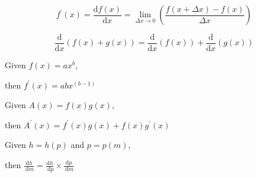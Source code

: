 \documentclass[10pt,a4paper]{Template}
\begin{document}
\thispagestyle{empty}


\begin{minipage}{0.48\textwidth}


\[ f^{\prime}(x)=\frac{\mathrm{d} f(x)}{\mathrm{d} x}=\lim _{\Delta x \rightarrow 0}\left(\frac{f(x+\Delta x)-f(x)}{\Delta x}\right)\]

\divider


\[
\frac{\mathrm{d}}{\mathrm{d} x}(f(x)+g(x))=\frac{\mathrm{d}}{\mathrm{d} x}(f(x))+\frac{\mathrm{d}}{\mathrm{d} x}(g(x))
\]

\divider


\vspace{-0.15cm}

\begin{center}
Given $f(x)=a x^{b}$,

then $f^{\prime}(x)=a b x^{(b-1)}$
\end{center}

\vspace{-0.15cm}

\divider


\vspace{-0.15cm}

\begin{center}
Given $A(x)=f(x) g(x)$,

then $A^{\prime}(x)=f^{\prime}(x) g(x)+f(x) g^{\prime}(x)$
\end{center}

\vspace{-0.15cm}

\divider


\vspace{-0.15cm}

\begin{center}
Given $h=h(p)$ and $p=p(m)$,

then $\frac{\mathrm{d} h}{\mathrm{~d} m}=\frac{\mathrm{d} h}{\mathrm{~d} p} \times \frac{\mathrm{d} p}{\mathrm{~d} m}$
\end{center}

\vspace{-0.15cm}


\end{minipage}
\end{document}
